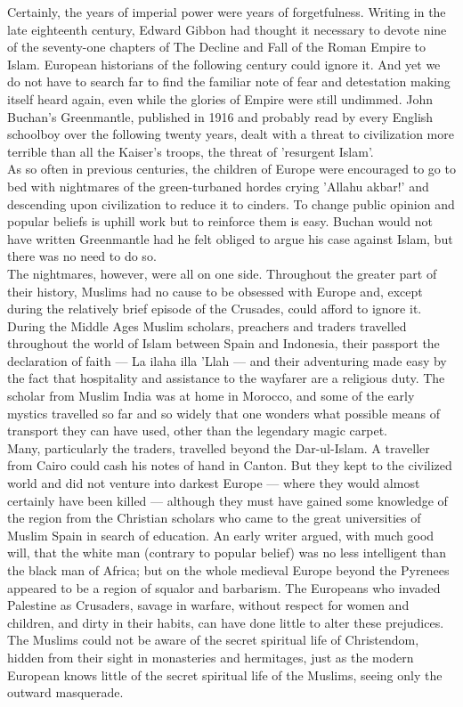 \documentclass[10pt, twoside,openright]{book}
\begin{document}
Certainly, the years of imperial power were years of forgetfulness. Writing in the late eighteenth century, Edward Gibbon had thought it necessary to devote nine of the seventy\hyp{}one chapters of The Decline and Fall of the Roman Empire to Islam. European historians of the following century could ignore it. And yet we do not have to search far to find the familiar note of fear and detestation making itself heard again, even while the glories of Empire were still undimmed. John Buchan's Greenmantle, published in 1916 and probably read by every English schoolboy over the following twenty years, dealt with a threat to civilization more terrible than all the Kaiser's troops, the threat of 'resurgent Islam'. \\

As so often in previous centuries, the children of Europe were encouraged to go to bed with nightmares of the green\hyp{}turbaned hordes crying 'Allahu akbar!' and descending upon civilization to reduce it to cinders. To change public opinion and popular beliefs is uphill work but to reinforce them is easy. Buchan would not have written Greenmantle had he felt obliged to argue his case against Islam, but there was no need to do so. \\

The nightmares, however, were all on one side. Throughout the greater part of their history, Muslims had no cause to be obsessed with Europe and, except during the relatively brief episode of the Crusades, could afford to ignore it. During the Middle Ages Muslim scholars, preachers and traders travelled throughout the world of Islam between Spain and Indonesia, their passport the declaration of faith --- La ilaha illa 'Llah --- and their adventuring made easy by the fact that hospitality and assistance to the wayfarer are a religious duty. The scholar from Muslim India was at home in Morocco, and some of the early mystics travelled so far and so widely that one wonders what possible means of transport they can have used, other than the legendary magic carpet. \\

Many, particularly the traders, travelled beyond the Dar\hyp{}ul\hyp{}Islam. A traveller from Cairo could cash his notes of hand in Canton. But they kept to the civilized world and did not venture into darkest Europe --- where they would almost certainly have been killed --- although they must have gained some knowledge of the region from the Christian scholars who came to the great universities of Muslim Spain in search of education. An early writer argued, with much good will, that the white man (contrary to popular belief) was no less intelligent than the black man of Africa; but on the whole medieval Europe beyond the Pyrenees appeared to be a region of squalor and barbarism. The Europeans who invaded Palestine as Crusaders, savage in warfare, without respect for women and children, and dirty in their habits, can have done little to alter these prejudices. The Muslims could not be aware of the secret spiritual life of Christendom, hidden from their sight in monasteries and hermitages, just as the modern European knows little of the secret spiritual life of the Muslims, seeing only the outward masquerade. \\
\end{document}
